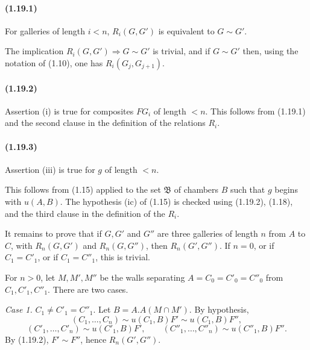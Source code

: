 \documentclass[10pt]{article}
\begin{document}
\paragraph{(1.19.1)} For galleries of length $i<n$, $R_i(G,G')$ is equivalent to $G\sim G'$.

The implication $R_i(G,G')\Rightarrow G\sim G'$ is trivial, and if $G\sim G'$ then, using the notation of (1.10), one has $R_i(G_j,G_{j+1})$.

\paragraph{(1.19.2)} Assertion (i) is true for composites $FG_i$ of length $<n$. This follows from (1.19.1) and the second clause in the definition of the relations $R_i$.

\paragraph{(1.19.3)} Assertion (iii) is true for $g$ of length $<n$.

This follows from (1.15) applied to the set $\mathfrak B$ of chambers $B$ such that $g$ begins with $u(A,B)$. The hypothesis (ic) of (1.15) is checked using (1.19.2), (1.18), and the third clause in the definition of the $R_i$.

It remains to prove that if $G,G'$ and $G''$ are three galleries of length $n$ from $A$ to $C$, with $R_n(G,G')$ and $R_n(G,G'')$, then $R_n(G',G'')$. If $n=0$, or if $C_1=C'_1$, or if $C_1=C''_1$, this is trivial.

For $n>0$, let $M,M',M''$ be the walls separating $A=C_0=C'_0=C''_0$ from $C_1,C'_1,C''_1$. There are two cases.

\emph{Case 1.} $C_1\ne C'_1=C''_1$. Let $B=A.A(M\cap M')$. By hypothesis,
\[
(C_1,\ldots,C_n)\sim u(C_1,B)F'\sim u(C_1,B)F'',
\]
\[
(C'_1,\ldots,C'_n)\sim u(C'_1,B)F',\qquad
(C''_1,\ldots,C''_n)\sim u(C''_1,B)F''.
\]
By (1.19.2), $F'\sim F''$, hence $R_n(G',G'')$.
\end{document}
